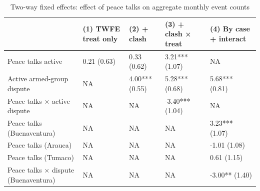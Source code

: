 \begin{table}

\caption{\label{tab:results_twfe}Two-way fixed effects: effect of peace talks on aggregate monthly event counts}
\centering
\begin{tabular}[t]{lllll}
\toprule
 & (1) TWFE treat only & (2) + clash & (3) + clash × treat & (4) By case + interact\\
\midrule
Peace talks active & 0.21 (0.63) & 0.33 (0.62) & 3.21*** (1.07) & NA\\
Active armed-group dispute & NA & 4.00*** (0.55) & 5.28*** (0.68) & 5.68*** (0.81)\\
Peace talks × active dispute & NA & NA & -3.40*** (1.04) & NA\\
Peace talks (Buenaventura) & NA & NA & NA & 3.23*** (1.07)\\
Peace talks (Arauca) & NA & NA & NA & -1.01 (1.08)\\
\addlinespace
Peace talks (Tumaco) & NA & NA & NA & 0.61 (1.15)\\
Peace talks × dispute (Buenaventura) & NA & NA & NA & -3.00** (1.40)\\
\bottomrule
\end{tabular}
\end{table}

